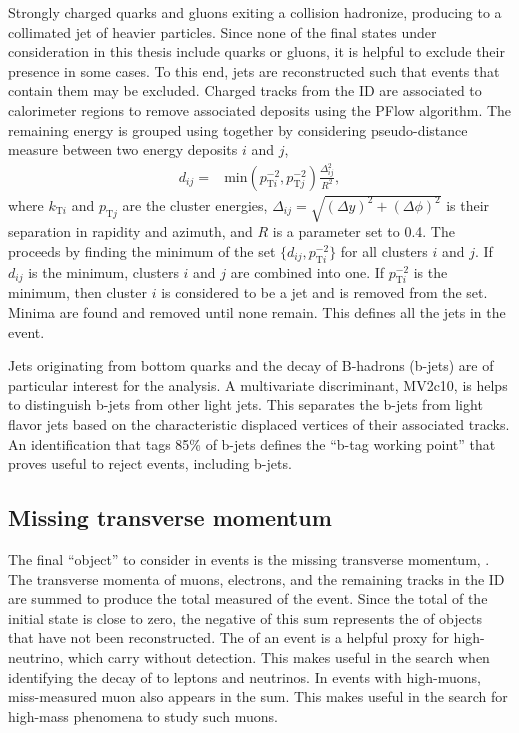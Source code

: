 Strongly charged quarks and gluons exiting a collision hadronize, producing to a collimated jet of heavier particles.
Since none of the final states under consideration in this thesis include quarks or gluons, it is helpful to exclude their presence in some cases.
To this end, jets are reconstructed such that events that contain them may be excluded.
Charged tracks from the ID are associated to calorimeter regions to remove associated deposits using the PFlow algorithm. \cite{jetReco}
The remaining energy is grouped using together by considering pseudo-distance measure between two energy deposits $i$ and $j$,
\begin{equation}\begin{split}
d_{ij} =& \text{min}(p^{-2}_{\text{T}i},p^{-2}_{\text{T}j})\frac{\Delta_{ij}^2}{R^2},
\end{split}\end{equation} 
where $k_{\text{T}i}$ and $p_{\text{T}j}$ are the cluster energies, $\Delta_{ij}=\sqrt{(\Delta y)^2+(\Delta\phi)^2}$ is their separation in rapidity and azimuth, and $R$ is a parameter set to 0.4.
The proceeds by finding the minimum of the set $\{d_{ij},p^{-2}_{\text{T}i}\}$ for all clusters $i$ and $j$. 
If $d_{ij}$ is the minimum, clusters $i$ and $j$ are combined into one.
If $p^{-2}_{\text{T}i}$ is the minimum, then cluster $i$ is considered to be a jet and is removed from the set.
Minima are found and removed until none remain.
This defines all the jets in the event. \cite{antikt}

Jets originating from bottom quarks and the decay of B-hadrons (b-jets) are of particular interest for the \hmm analysis.
A multivariate discriminant, MV2c10, is helps to distinguish b-jets from other light jets. \cite{btag}
This separates the b-jets from light flavor jets based on the characteristic displaced vertices of their associated tracks.
An identification that tags 85\% of b-jets defines the ``b-tag working point'' that proves useful to reject events, including b-jets.

\subsection{Missing transverse momentum}

The final ``object'' to consider in events is the missing transverse momentum, \met.
The transverse momenta of muons, electrons, and the remaining tracks in the ID are summed to produce the total measured \pt of the event.
Since the total \pt of the initial state is close to zero, the negative of this \pt sum represents the \pt of objects that have not been reconstructed.  \cite{met}
The \met of an event is a helpful proxy for high-\pt neutrino, which carry \pt without detection.
This makes \met useful in the \hmm search when identifying the decay of \W to leptons and neutrinos.
In events with high-\pi muons, miss-measured muon \pt also appears in the \met sum.
This makes \met useful in the search for high-mass phenomena to study such muons.
